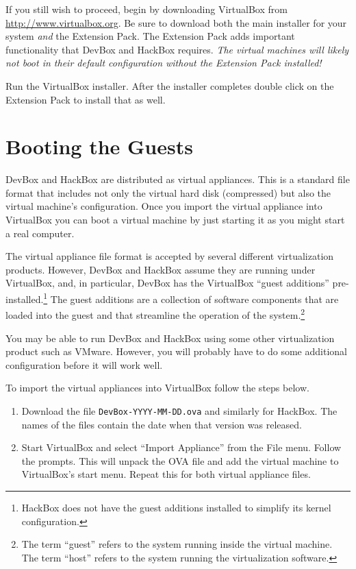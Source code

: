 \documentclass[twocolumn]{article}
\begin{document}
If you still wish to proceed, begin by downloading VirtualBox from
\url{http://www.virtualbox.org}. Be sure to download both the main installer for your system
\emph{and} the Extension Pack. The Extension Pack adds important functionality that DevBox and
HackBox requires. \emph{The virtual machines will likely not boot in their default configuration
  without the Extension Pack installed!}

Run the VirtualBox installer. After the installer completes double click on the Extension Pack
to install that as well.

\section{Booting the Guests}
\label{sec:booting-guests}

DevBox and HackBox are distributed as virtual appliances. This is a standard file format that
includes not only the virtual hard disk (compressed) but also the virtual machine's
configuration. Once you import the virtual appliance into VirtualBox you can boot a virtual
machine by just starting it as you might start a real computer.

The virtual appliance file format is accepted by several different virtualization products.
However, DevBox and HackBox assume they are running under VirtualBox, and, in particular, DevBox
has the VirtualBox ``guest additions'' pre-installed.\footnote{HackBox does not have the guest
  additions installed to simplify its kernel configuration.} The guest additions are a
collection of software components that are loaded into the guest and that streamline the
operation of the system.\footnote{The term ``guest'' refers to the system running inside the
  virtual machine. The term ``host'' refers to the system running the virtualization software.}

You may be able to run DevBox and HackBox using some other virtualization product such as
VMware. However, you will probably have to do some additional configuration before it will work
well.

To import the virtual appliances into VirtualBox follow the steps below.

\begin{enumerate}

\item Download the file \texttt{DevBox-YYYY-MM-DD.ova} and similarly for HackBox. The names of
  the files contain the date when that version was released.

\item Start VirtualBox and select ``Import Appliance'' from the File menu. Follow the prompts.
  This will unpack the OVA file and add the virtual machine to VirtualBox's start menu. Repeat
  this for both virtual appliance files.

\end{enumerate}
\end{document}
